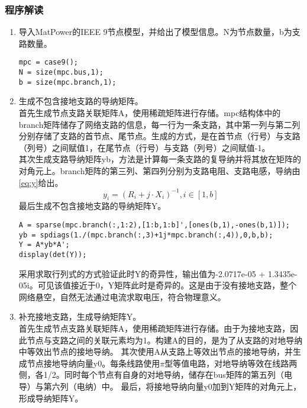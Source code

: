 \documentclass[a4paper,12pt]{article}
\begin{document}
    \subsubsection{程序解读}
    \begin{enumerate}
      \item 导入MatPower\cite{zimmerman2011matpower}的IEEE 9节点模型，并给出了模型信息。N为节点数量，b为支路数量。
      \begin{lstlisting}[style=Matlab-editor,basicstyle=\mlttfamily]
mpc = case9();
N = size(mpc.bus,1);
b = size(mpc.branch,1);
      \end{lstlisting}
      \item 生成不包含接地支路的导纳矩阵。\\
      首先生成节点支路关联矩阵A，使用稀疏矩阵进行存储。mpc结构体中的branch矩阵储存了网络支路的信息，每一行为一条支路，其中第一列与第二列分别存储了支路的首节点、尾节点。生成的方式，是在首节点（行号）与支路（列号）之间赋值1，在尾节点（行号）与支路（列号）之间赋值-1。\\
      其次生成支路导纳矩阵yb，方法是计算每一条支路的复导纳并将其放在矩阵的对角元上。branch矩阵的第三列、第四列分别为支路电阻、支路电感，导纳由\cref{eq:y}给出。\\
      \begin{equation}
        \label{eq:y}
        y_i = (R_i + j \cdot X_i)^{-1}, i\in[1, b]
      \end{equation}
      最后生成不包含接地支路的导纳矩阵Y。\\
      \begin{lstlisting}[style=Matlab-editor,basicstyle=\mlttfamily]
A = sparse(mpc.branch(:,1:2),[1:b,1:b]',[ones(b,1),-ones(b,1)]);
yb = spdiags(1./(mpc.branch(:,3)+1j*mpc.branch(:,4)),0,b,b);
Y = A*yb*A';
display(det(Y));
      \end{lstlisting}
      采用求取行列式的方式验证此时Y的奇异性，输出值为-2.0717e-05 + 1.3435e-05i。可见该值接近于0，Y矩阵此时是奇异的。这是由于没有接地支路，整个网络悬空，自然无法通过电流求取电压，符合物理意义。
      \item 补充接地支路，生成导纳矩阵Y。\\
      首先生成节点支路关联矩阵A，使用稀疏矩阵进行存储。由于为接地支路，因此节点与支路之间的关联元素均为1。构建A的目的，是为了从支路的对地导纳中等效出节点的接地导纳。
      其次使用A从支路上等效出节点的接地导纳，并生成节点接地导纳向量y0。每条线路使用$\pi$型等值电路，对地导纳等效在线路两侧，各1/2。同时每个节点有自身的对地导纳，储存在bus矩阵的第五列（电导）与第六列（电纳）中。
      最后，将接地导纳向量y0加到Y矩阵的对角元上，形成导纳矩阵Y。

\end{enumerate}
\end{document}
